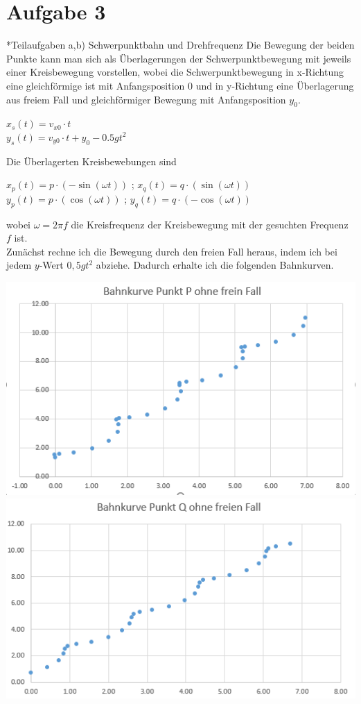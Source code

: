 \documentclass{article}
\begin{document}
\section*{Aufgabe 3}*{Teilaufgaben a,b) Schwerpunktbahn und Drehfrequenz}
Die Bewegung der beiden Punkte kann man sich als Überlagerungen der Schwerpunktbewegung mit jeweils einer Kreisbewegung vorstellen, wobei die Schwerpunktbewegung in x-Richtung eine gleichförmige ist mit 
Anfangsposition 0 und in y-Richtung eine Überlagerung aus freiem Fall und gleichförmiger Bewegung mit Anfangsposition $y_0$.
\begin{center}
	$x_s (t)= v_{x0}\cdot t$ \\
	$y_s (t) = v_{y0}\cdot t + y_0 -0.5 g t^2$
\end{center}   
Die Überlagerten Kreisbewebungen sind
\begin{center}
	$x_p (t) = p \cdot (-\sin(\omega t))$ ; $x_q (t)= q \cdot (\sin(\omega t)) $\\
	$y_p (t) = p \cdot (\cos(\omega t))$ ; $y_q (t)= q \cdot (-\cos(\omega t)) $
\end{center} 
wobei $\omega = 2\pi f $ die Kreisfrequenz der Kreisbewegung mit der gesuchten Frequenz $f$ ist.\\
Zunächst rechne ich die Bewegung durch den freien Fall heraus, 
indem ich bei jedem $y$-Wert $0,5gt^2$ abziehe. Dadurch erhalte ich die folgenden Bahnkurven.
\begin{center}
	\includegraphics[scale=0.38]{Kurve-P-Punkt-ohne-freien-Fall.png}
	\includegraphics[scale=0.42]{Kurve-Q-Punkt-ohne-freien-Fall.png}
\end{center}
\end{document}
